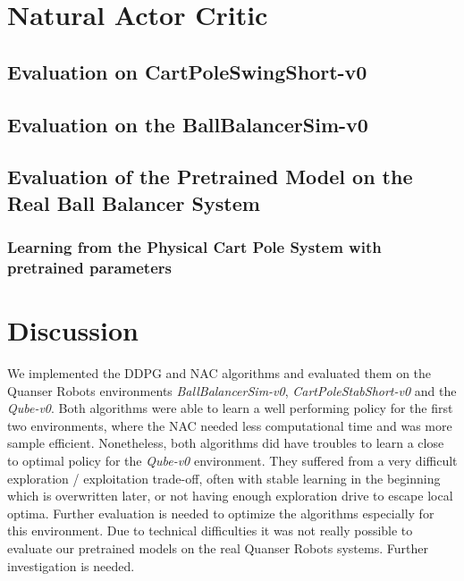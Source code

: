 \section{Natural Actor Critic}
\label{sec:nac}
\subsection{Evaluation on CartPoleSwingShort-v0}
\subsection{Evaluation on the BallBalancerSim-v0}
\subsection{Evaluation of the Pretrained Model on the Real Ball Balancer System}
\subsubsection{Learning from the Physical Cart Pole System with pretrained parameters}

\section{Discussion}
We implemented the DDPG and NAC algorithms and evaluated them on the Quanser Robots environments \textit{BallBalancerSim-v0}, \textit{CartPoleStabShort-v0} and the \textit{Qube-v0}. Both algorithms were able to learn a well performing policy for the first two environments, where the NAC needed less computational time and was more sample efficient. Nonetheless, both algorithms did have troubles to learn a close to optimal policy for the \textit{Qube-v0} environment. They suffered from a very difficult exploration / exploitation trade-off, often with stable learning in the beginning which is overwritten later, or not having enough exploration drive to escape local optima. Further evaluation is needed to optimize the algorithms especially for this environment. Due to technical difficulties it was not really possible to evaluate our pretrained models on the real Quanser Robots systems. Further investigation is needed.
\label{sec:conclusion}






